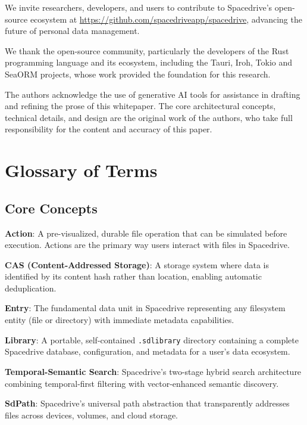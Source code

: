 \documentclass[sigconf]{acmart}
\begin{document}
We invite researchers, developers, and users to contribute to Spacedrive's open-source ecosystem at \url{https://github.com/spacedriveapp/spacedrive}, advancing the future of personal data management.


\begin{acks}
We thank the open-source community, particularly the developers of the Rust programming language and its ecosystem, including the Tauri, Iroh, Tokio and SeaORM projects, whose work provided the foundation for this research.

The authors acknowledge the use of generative AI tools for assistance in drafting and refining the prose of this whitepaper. The core architectural concepts, technical details, and design are the original work of the authors, who take full responsibility for the content and accuracy of this paper.
\end{acks}


\appendix
\section{Glossary of Terms}

\subsection*{Core Concepts}

\textbf{Action}: A pre-visualized, durable file operation that can be simulated before execution. Actions are the primary way users interact with files in Spacedrive.

\textbf{CAS (Content-Addressed Storage)}: A storage system where data is identified by its content hash rather than location, enabling automatic deduplication.

\textbf{Entry}: The fundamental data unit in Spacedrive representing any filesystem entity (file or directory) with immediate metadata capabilities.

\textbf{Library}: A portable, self-contained \texttt{.sdlibrary} directory containing a complete Spacedrive database, configuration, and metadata for a user's data ecosystem.

\textbf{Temporal-Semantic Search}: Spacedrive's two-stage hybrid search architecture combining temporal-first filtering with vector-enhanced semantic discovery.

\textbf{SdPath}: Spacedrive's universal path abstraction that transparently addresses files across devices, volumes, and cloud storage.
\end{document}
